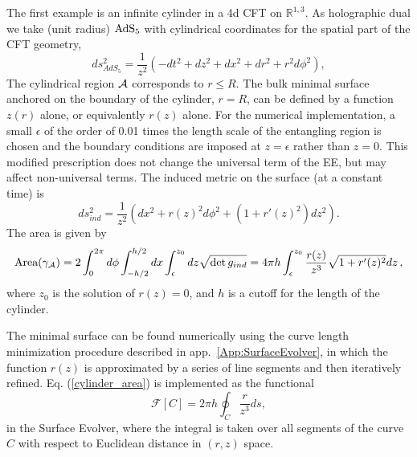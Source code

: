 \documentclass[11 pt]{article}
\def\be{\begin{equation}}
\def\ee{\end{equation}}
\def\RR{{\mathds{R}}}
\begin{document}
The first example is an infinite cylinder in a 4d CFT on $\RR^{1,3}$. As holographic dual we take (unit radius) $\rm AdS_5$ with cylindrical coordinates for the spatial part of the CFT geometry, 
\be \label{eq:AdS5-metric}
ds^2_{AdS_5}=\frac{1}{z^2}\left(-dt^2+dz^2+dx^2+dr^2+r^2d\phi^2\right),
\ee
The cylindrical region $\cal A$ corresponds to $r\leq R$. 
The bulk minimal surface anchored on the boundary of the cylinder, $r=R$, can be defined by a function $z(r)$ alone, or equivalently $r(z)$ alone.
For the numerical implementation, a small $\epsilon$ of the order of 0.01 times the length scale of the entangling region is chosen and the boundary conditions  are imposed at $z=\epsilon$ rather than $z=0$. This modified prescription does not change the universal term of the EE, but may affect non-universal terms. %
The induced metric on the surface (at a constant time) is
\be 
ds_{ind}^2=\frac{1}{z^2}\left(dx^2+r(z)^2d\phi^2 + (1+r'(z)^2)dz^2\right).
\ee
The area is given by
\begin{equation}
    \text{Area}(\gamma_{\cal A}) =  2 \int_0^{2\pi}d\phi\int_{-h/2}^{h/2}dx\int_\epsilon^{z_0}dz \sqrt{\det g_{ind}} =  4 \pi h\int_\epsilon^{z_0}\frac{r(z)}{z^3}\sqrt{1+r'(z)^2}dz\,,
    \label{cylinder_area}
\end{equation}
where $z_0$ is the solution of $r(z)=0$, and $h$ is a cutoff for the length of the cylinder.

The minimal surface can be found numerically using the  curve length minimization procedure described in app.~\ref{App:SurfaceEvolver}, in  which the function $r(z)$ is approximated by a series of line segments and then iteratively refined. Eq. (\ref{cylinder_area}) is implemented as the functional
\begin{equation}
    \mathcal{F}[C]=2 \pi h\oint_C \frac{r}{z^3}ds,
    \label{cylinder_func_actual}
\end{equation}
in the Surface Evolver, where the integral is taken over all segments of the curve $C$ with respect to Euclidean distance in $(r,z)$ space.
\end{document}
